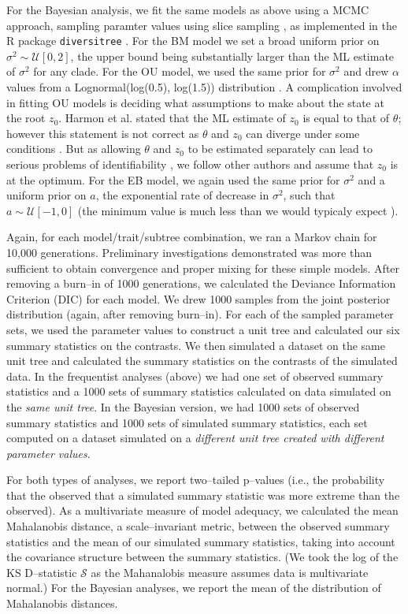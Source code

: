 \documentclass[a4paper,12pt]{article}
\begin{document}
For the Bayesian analysis, we fit the same models as above using a MCMC approach, sampling paramter values using slice sampling \citep{Nealslice}, as implemented in the R package \texttt{diversitree} \citep{FitzJohn2012}. For the BM model we set a broad uniform prior on $\sigma^2 \sim \mathcal{U}[0, 2]$, the upper bound being substantially larger than the ML estimate of $\sigma^2$ for any clade. For the OU model, we used the same prior for $\sigma^2$ and drew $\alpha$ values from a Lognormal(log(0.5), log(1.5)) distribution \citep{UyedaBayou}. A complication involved in fitting OU models is deciding what assumptions to make about the state at the root $z_0$. Harmon et al. \citep{Harmon2010} stated that the ML estimate of $z_0$ is equal to that of $\theta$; however this statement is not correct as $\theta$ and $z_0$ can diverge under some conditions \citep{HoAne2012}. But as allowing $\theta$ and $z_0$ to be estimated separately can lead to serious problems of identifiability \citep{HoAne2012}, we follow other authors \citep{Labra2009, Beaulieu2012} and assume that $z_0$ is at the optimum. For the EB model, we again used the same prior for $\sigma^2$ and a uniform prior on $a$, the exponential rate of decrease in $\sigma^2$, such that $a \sim \mathcal{U}[-1, 0]$ (the minimum value is much less than we would typicaly expect \citep{SlaterPennell}).

Again, for each model/trait/subtree combination, we ran a Markov chain for 10,000 generations. Preliminary investigations demonstrated was more than sufficient to obtain convergence and proper mixing for these simple models. After removing a burn--in of 1000 generations, we calculated the Deviance Information Criterion (DIC) \citep{dic} for each model. We drew 1000 samples from the joint posterior distribution (again, after removing burn--in). For each of the sampled parameter sets, we used the parameter values to construct a unit tree and calculated our six summary statistics on the contrasts. We then simulated a dataset on the same unit tree and calculated the summary statistics on the contrasts of the simulated data. In the frequentist analyses (above) we had one set of observed summary statistics and a 1000 sets of summary statistics calculated on data simulated on the \emph{same unit tree}. In the Bayesian version, we had 1000 sets of observed summary statistics and 1000 sets of simulated summary statistics, each set computed on a dataset simulated on a \emph{different unit tree created with different parameter values}.
 
For both types of analyses, we report two--tailed p--values (i.e., the probability that the observed that a simulated summary statistic was more extreme than the observed). As a multivariate measure of model adequacy, we calculated the mean Mahalanobis distance, a scale--invariant metric, between the observed summary statistics and the mean of our simulated summary statistics, taking into account the covariance structure between the summary statistics. (We took the log of the KS D--statistic $\mathcal{S}$ as the Mahanalobis measure assumes data is multivariate normal.) For the Bayesian analyses, we report the mean of the distribution of Mahalanobis distances. 
\end{document}
